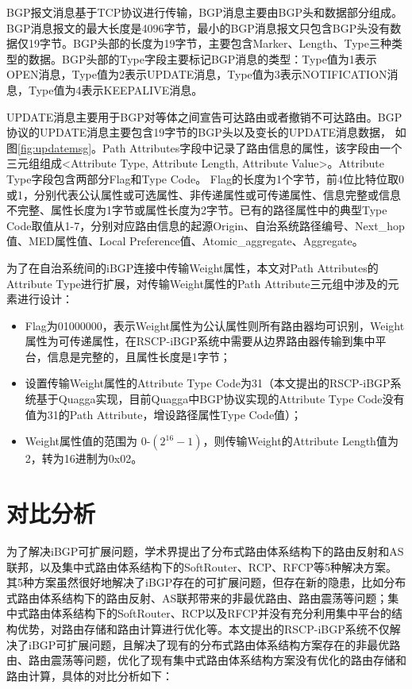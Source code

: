 BGP报文消息\cite{rfc4271}基于TCP协议进行传输，BGP消息主要由BGP头和数据部分组成。BGP消息报文的最大长度是4096字节，最小的BGP消息报文只包含BGP头没有数据仅19字节。BGP头部的长度为19字节，主要包含Marker、Length、Type三种类型的数据。BGP头部的Type字段主要标记BGP消息的类型：Type值为1表示OPEN消息，Type值为2表示UPDATE消息，Type值为3表示NOTIFICATION消息，Type值为4表示KEEPALIVE消息。

UPDATE消息主要用于BGP对等体之间宣告可达路由或者撤销不可达路由。BGP协议的UPDATE消息主要包含19字节的BGP头以及变长的UPDATE消息数据， 如图\ref{fig:updatemsg}。Path Attributes字段中记录了路由信息的属性，该字段由一个三元组组成<Attribute Type, Attribute Length, Attribute Value>。Attribute Type字段包含两部分Flag和Type Code。 Flag的长度为1个字节，前4位比特位取0或1，分别代表公认属性或可选属性、非传递属性或可传递属性、信息完整或信息不完整、属性长度为1字节或属性长度为2字节。已有的路径属性中的典型Type Code取值从1-7，分别对应路由信息的起源Origin、自治系统路径编号、Next\_hop值、MED属性值、Local Preference值、Atomic\_aggregate、Aggregate。

为了在自治系统间的iBGP连接中传输Weight属性，本文对Path Attributes的Attribute Type进行扩展，对传输Weight属性的Path Attribute三元组中涉及的元素进行设计：
\begin{itemize}
  \item Flag为01000000，表示Weight属性为公认属性则所有路由器均可识别，Weight属性为可传递属性，在RSCP-iBGP系统中需要从边界路由器传输到集中平台，信息是完整的，且属性长度是1字节；
  \item 设置传输Weight属性的Attribute Type Code为31（本文提出的RSCP-iBGP系统基于Quagga\cite{quagga}实现，目前Quagga中BGP协议实现的Attribute Type Code没有值为31的Path Attribute，增设路径属性Type Code值）；
  \item Weight属性值的范围为 0-$(2^{16}-1)$，则传输Weight的Attribute Length值为2，转为16进制为0x02。
\end{itemize}

\section{对比分析}

为了解决iBGP可扩展问题，学术界提出了分布式路由体系结构下的路由反射和AS联邦，以及集中式路由体系结构下的SoftRouter、RCP、RFCP等5种解决方案。其5种方案虽然很好地解决了iBGP存在的可扩展问题，但存在新的隐患，比如分布式路由体系结构下的路由反射、AS联邦带来的非最优路由、路由震荡等问题；集中式路由体系结构下的SoftRouter、RCP以及RFCP并没有充分利用集中平台的结构优势，对路由存储和路由计算进行优化等。本文提出的RSCP-iBGP系统不仅解决了iBGP可扩展问题，且解决了现有的分布式路由体系结构方案存在的非最优路由、路由震荡等问题，优化了现有集中式路由体系结构方案没有优化的路由存储和路由计算，具体的对比分析如下：

